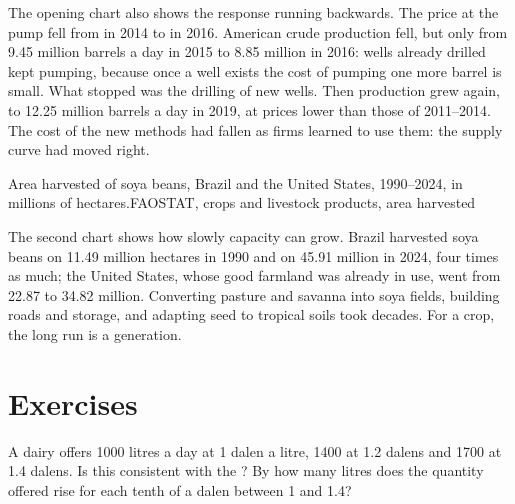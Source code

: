 The opening chart also shows the response running backwards. The price at the pump fell from  in 2014 to  in
2016. American crude production fell, but only from 9.45 million barrels a day in 2015 to 8.85 million in 2016: wells already
drilled kept pumping, because once a well exists the cost of pumping one more barrel is small. What stopped was the drilling of new
wells. Then production grew again, to 12.25 million barrels a day in 2019, at prices lower than those of 2011--2014. The cost of the
new methods had fallen as firms learned to use them: the supply curve had moved right.

\begin{omchart}{Area harvested of soya beans, Brazil and the United States, 1990--2024, in millions of hectares.}{FAOSTAT,
crops and livestock products, area harvested}
\end{omchart}

The second chart shows how slowly capacity can grow. Brazil harvested soya beans on 11.49 million hectares in 1990 and on 45.91 million in
2024, four times as much; the United States, whose good farmland was already in use, went from 22.87 to 34.82 million. Converting
pasture and savanna into soya fields, building roads and storage, and adapting seed to tropical soils took decades. For a crop, the
long run is a generation.

\section{Exercises}

\begin{exercise}[$\star$]\label{exo:g10:supply:1}
A dairy offers \num{1000} litres a day at 1 dalen a litre, \num{1400} at 1.2 dalens and \num{1700} at 1.4 dalens. Is this consistent with
the ? By how many litres does the quantity offered rise for each tenth of a dalen between 1 and 1.4?
\end{exercise}

